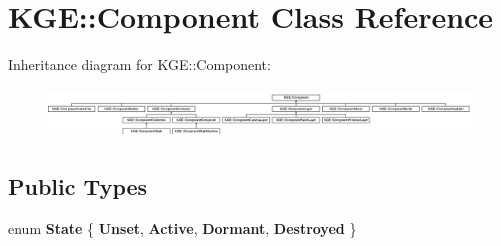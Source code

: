 \hypertarget{class_k_g_e_1_1_component}{\section{K\-G\-E\-:\-:Component Class Reference}
\label{class_k_g_e_1_1_component}
}
Inheritance diagram for K\-G\-E\-:\-:Component\-:\begin{figure}[H]
\begin{center}
\leavevmode
\includegraphics[height=1.303083cm]{class_k_g_e_1_1_component}
\end{center}
\end{figure}
\subsection*{Public Types}
\begin{DoxyCompactItemize}
\item 
enum {\bfseries State} \{ {\bfseries Unset}, 
{\bfseries Active}, 
{\bfseries Dormant}, 
{\bfseries Destroyed}
 \}
\end{DoxyCompactItemize}

